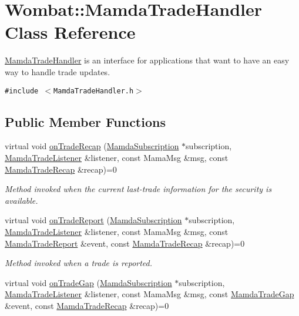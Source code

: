 \hypertarget{classWombat_1_1MamdaTradeHandler}{
\section{Wombat::Mamda\-Trade\-Handler Class Reference}
\label{classWombat_1_1MamdaTradeHandler}
}
\hyperlink{classWombat_1_1MamdaTradeHandler}{Mamda\-Trade\-Handler} is an interface for applications that want to have an easy way to handle trade updates.  


{\tt \#include $<$Mamda\-Trade\-Handler.h$>$}

\subsection*{Public Member Functions}
\begin{CompactItemize}
\item 
virtual void \hyperlink{classWombat_1_1MamdaTradeHandler_1b60cb151264fa92967be4c6468e2fbe}{on\-Trade\-Recap} (\hyperlink{classWombat_1_1MamdaSubscription}{Mamda\-Subscription} $\ast$subscription, \hyperlink{classWombat_1_1MamdaTradeListener}{Mamda\-Trade\-Listener} \&listener, const Mama\-Msg \&msg, const \hyperlink{classWombat_1_1MamdaTradeRecap}{Mamda\-Trade\-Recap} \&recap)=0
\begin{CompactList}\small\item\em Method invoked when the current last-trade information for the security is available. \item\end{CompactList}\item 
virtual void \hyperlink{classWombat_1_1MamdaTradeHandler_627de635c463dad8736b3c4fbf6f40ed}{on\-Trade\-Report} (\hyperlink{classWombat_1_1MamdaSubscription}{Mamda\-Subscription} $\ast$subscription, \hyperlink{classWombat_1_1MamdaTradeListener}{Mamda\-Trade\-Listener} \&listener, const Mama\-Msg \&msg, const \hyperlink{classWombat_1_1MamdaTradeReport}{Mamda\-Trade\-Report} \&event, const \hyperlink{classWombat_1_1MamdaTradeRecap}{Mamda\-Trade\-Recap} \&recap)=0
\begin{CompactList}\small\item\em Method invoked when a trade is reported. \item\end{CompactList}\item 
virtual void \hyperlink{classWombat_1_1MamdaTradeHandler_ba0b748342b02c74f6cc52c9f53426f1}{on\-Trade\-Gap} (\hyperlink{classWombat_1_1MamdaSubscription}{Mamda\-Subscription} $\ast$subscription, \hyperlink{classWombat_1_1MamdaTradeListener}{Mamda\-Trade\-Listener} \&listener, const Mama\-Msg \&msg, const \hyperlink{classWombat_1_1MamdaTradeGap}{Mamda\-Trade\-Gap} \&event, const \hyperlink{classWombat_1_1MamdaTradeRecap}{Mamda\-Trade\-Recap} \&recap)=0

\end{CompactItemize}
